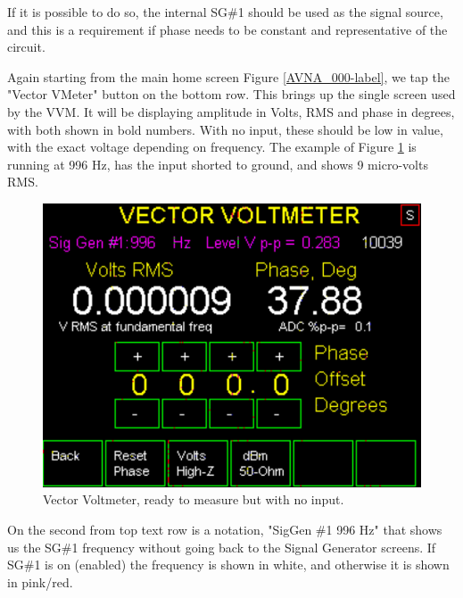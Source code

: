 If it is possible to do so, the internal SG\#1 should be used as the signal source, and this is a requirement if phase needs to be constant and representative of the circuit.

Again starting from the main home screen Figure \ref{AVNA_000-label}, we tap the "Vector VMeter" button on the bottom row.  This brings up the single screen used by the VVM.  It will be displaying amplitude in Volts, RMS  and phase in degrees, with both shown in bold numbers.  With no input, these should be low in value, with the exact voltage depending on frequency.  The example of Figure  \ref{AVNA_015-label} is running at 996 Hz, has the input shorted to ground, and shows 9 micro-volts RMS.
%
\begin{figure}[H]
\begin{center}
\includegraphics[scale=0.75]{./images/AVNA_015.pdf}
\caption{Vector Voltmeter, ready to measure but with no input.}
\label{AVNA_015-label}
\end{center}
\end{figure}
%
On the second from top text row is a notation, "SigGen \#1 996 Hz" that shows us the SG\#1 frequency without going back to the Signal Generator screens.  If SG\#1 is on (enabled) the frequency is shown in white, and otherwise it is shown in pink/red.

